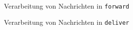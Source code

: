 \begin{figure}[htbp]
\centering
{}
\caption{Verarbeitung von Nachrichten in \texttt{forward}}
\label{fig:processing_forward}
\end{figure}

\begin{figure}[htbp]
\centering
{}
\caption{Verarbeitung von Nachrichten in \texttt{deliver}}
\label{fig:processing_deliver}
\end{figure}

